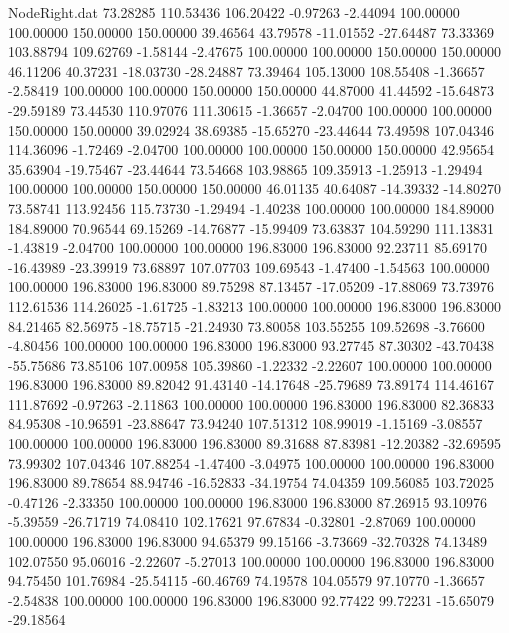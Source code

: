 \begin{filecontents}{NodeRight.dat}
  73.28285  110.53436  106.20422    -0.97263   -2.44094  100.00000  100.00000  150.00000  150.00000   39.46564   43.79578  -11.01552  -27.64487
  73.33369  103.88794  109.62769    -1.58144   -2.47675  100.00000  100.00000  150.00000  150.00000   46.11206   40.37231  -18.03730  -28.24887
  73.39464  105.13000  108.55408    -1.36657   -2.58419  100.00000  100.00000  150.00000  150.00000   44.87000   41.44592  -15.64873  -29.59189
  73.44530  110.97076  111.30615    -1.36657   -2.04700  100.00000  100.00000  150.00000  150.00000   39.02924   38.69385  -15.65270  -23.44644
  73.49598  107.04346  114.36096    -1.72469   -2.04700  100.00000  100.00000  150.00000  150.00000   42.95654   35.63904  -19.75467  -23.44644
  73.54668  103.98865  109.35913    -1.25913   -1.29494  100.00000  100.00000  150.00000  150.00000   46.01135   40.64087  -14.39332  -14.80270
  73.58741  113.92456  115.73730    -1.29494   -1.40238  100.00000  100.00000  184.89000  184.89000   70.96544   69.15269  -14.76877  -15.99409
  73.63837  104.59290  111.13831    -1.43819   -2.04700  100.00000  100.00000  196.83000  196.83000   92.23711   85.69170  -16.43989  -23.39919
  73.68897  107.07703  109.69543    -1.47400   -1.54563  100.00000  100.00000  196.83000  196.83000   89.75298   87.13457  -17.05209  -17.88069
  73.73976  112.61536  114.26025    -1.61725   -1.83213  100.00000  100.00000  196.83000  196.83000   84.21465   82.56975  -18.75715  -21.24930
  73.80058  103.55255  109.52698    -3.76600   -4.80456  100.00000  100.00000  196.83000  196.83000   93.27745   87.30302  -43.70438  -55.75686
  73.85106  107.00958  105.39860    -1.22332   -2.22607  100.00000  100.00000  196.83000  196.83000   89.82042   91.43140  -14.17648  -25.79689
  73.89174  114.46167  111.87692    -0.97263   -2.11863  100.00000  100.00000  196.83000  196.83000   82.36833   84.95308  -10.96591  -23.88647
  73.94240  107.51312  108.99019    -1.15169   -3.08557  100.00000  100.00000  196.83000  196.83000   89.31688   87.83981  -12.20382  -32.69595
  73.99302  107.04346  107.88254    -1.47400   -3.04975  100.00000  100.00000  196.83000  196.83000   89.78654   88.94746  -16.52833  -34.19754
  74.04359  109.56085  103.72025    -0.47126   -2.33350  100.00000  100.00000  196.83000  196.83000   87.26915   93.10976   -5.39559  -26.71719
  74.08410  102.17621   97.67834    -0.32801   -2.87069  100.00000  100.00000  196.83000  196.83000   94.65379   99.15166   -3.73669  -32.70328
  74.13489  102.07550   95.06016    -2.22607   -5.27013  100.00000  100.00000  196.83000  196.83000   94.75450  101.76984  -25.54115  -60.46769
  74.19578  104.05579   97.10770    -1.36657   -2.54838  100.00000  100.00000  196.83000  196.83000   92.77422   99.72231  -15.65079  -29.18564

\end{filecontents}
